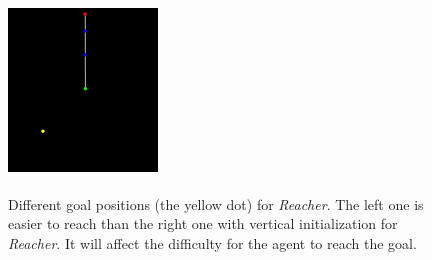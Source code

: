 \documentclass{article}
\begin{document}
\begin{figure}[htbp]
	\includegraphics[width=150, height=200]{img/goal_position1.png}
	\caption{Different goal positions (the yellow dot) for \textit{Reacher}. The left one is easier to reach than the right one with vertical initialization for \textit{Reacher}. It will affect the difficulty for the agent to reach the goal.}
	\label{fig:rpl1}
\end{figure}
\end{document}
